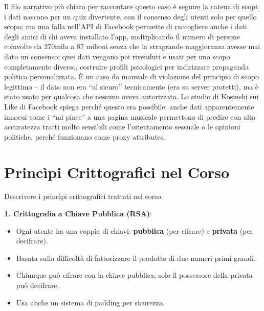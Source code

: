 \documentclass[a4paper,11pt]{article}
\begin{document}
\begin{nota}
Il filo narrativo pi\`{u} chiaro per raccontare questo caso \`{e} seguire la catena di scopi: i dati nascono per un quiz divertente, con il consenso degli utenti solo per quello scopo; ma una falla nell'API di Facebook permette di raccogliere anche i dati degli amici di chi aveva installato l'app, moltiplicando il numero di persone coinvolte da 270mila a 87 milioni senza che la stragrande maggioranza avesse mai dato un consenso; quei dati vengono poi rivenduti e usati per uno scopo completamente diverso, costruire profili psicologici per indirizzare propaganda politica personalizzata. \`{E} un caso da manuale di violazione del principio di scopo legittimo -- il dato non era ``al sicuro'' tecnicamente (era su server protetti), ma \`{e} stato usato per qualcosa che nessuno aveva autorizzato. Lo studio di Kosinski sui Like di Facebook spiega perch\'{e} questo era possibile: anche dati apparentemente innocui come i ``mi piace'' a una pagina musicale permettono di predire con alta accuratezza tratti molto sensibili come l'orientamento sessuale o le opinioni politiche, perch\'{e} funzionano come proxy attributes.
\end{nota}

\section{Princìpi Crittografici nel Corso}

\begin{domanda}
Descrivere i princìpi crittografici trattati nel corso.
\end{domanda}

\textbf{1. Crittografia a Chiave Pubblica (RSA)}:
\begin{itemize}
  \item Ogni utente ha una coppia di chiavi: \textbf{pubblica} (per cifrare) e \textbf{privata} (per decifrare).
  \item Basata sulla difficolt\`{a} di fattorizzare il prodotto di due numeri primi grandi.
  \item Chiunque pu\`{o} cifrare con la chiave pubblica; solo il possessore della privata pu\`{o} decifrare.
  \item Usa anche un sistema di padding per sicurezza.
\end{itemize}
\end{document}
